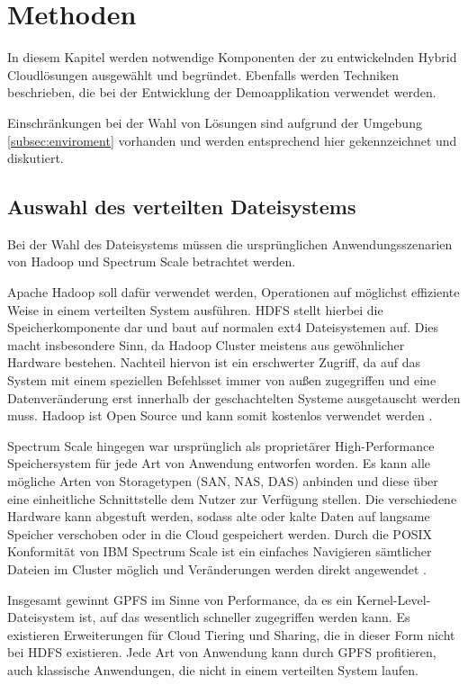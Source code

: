 \chapter{Methoden}\label{ch:methods}

In diesem Kapitel werden notwendige Komponenten der zu entwickelnden Hybrid Cloudlösungen ausgewählt und begründet. Ebenfalls werden Techniken beschrieben, die bei der Entwicklung der Demoapplikation verwendet werden. 

Einschränkungen bei der Wahl von Lösungen sind aufgrund der Umgebung \ref{subsec:enviroment} vorhanden und werden entsprechend hier gekennzeichnet und diskutiert.

\section{Auswahl des verteilten Dateisystems}
Bei der Wahl des Dateisystems müssen die ursprünglichen Anwendungsszenarien von Hadoop und Spectrum Scale betrachtet werden. 

Apache Hadoop soll dafür verwendet werden, Operationen auf möglichst effiziente Weise in einem verteilten System ausführen. \acs{HDFS} stellt hierbei die Speicherkomponente dar und baut auf normalen ext4 Dateisystemen auf. Dies macht insbesondere Sinn, da Hadoop Cluster meistens aus gewöhnlicher Hardware bestehen. Nachteil hiervon ist ein erschwerter Zugriff, da auf das System mit einem speziellen Befehlsset immer von außen zugegriffen und eine Datenveränderung erst innerhalb der geschachtelten Systeme ausgetauscht werden muss.
Hadoop ist Open Source und kann somit kostenlos verwendet werden \parencite{snowflake.2016}. 

Spectrum Scale hingegen war ursprünglich als proprietärer High-Performance Speichersystem für jede Art von Anwendung entworfen worden. Es kann alle mögliche Arten von Storagetypen (\acs{SAN}, \acs{NAS}, \acs{DAS}) anbinden und diese über eine einheitliche Schnittstelle dem Nutzer zur Verfügung stellen. Die verschiedene Hardware kann abgestuft werden, sodass alte oder kalte Daten auf langsame Speicher verschoben oder in die Cloud gespeichert werden.  Durch die \gls{POSIX} Konformität von IBM Spectrum Scale ist ein einfaches Navigieren sämtlicher Dateien im Cluster möglich und Veränderungen werden direkt angewendet \parencite{snowflake.2016}.

Insgesamt gewinnt \acs{GPFS} im Sinne von Performance, da es ein Kernel-Level-Dateisystem ist, auf das wesentlich schneller zugegriffen werden kann. Es existieren Erweiterungen für Cloud Tiering und Sharing, die in dieser Form nicht bei HDFS existieren. Jede Art von Anwendung kann durch \acs{GPFS} profitieren, auch klassische Anwendungen, die nicht in einem verteilten System laufen.

